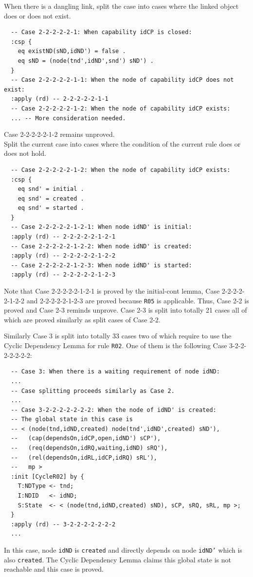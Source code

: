 \documentclass[12pt]{report}
\begin{document}
 When there is a dangling link, split the case
into cases where the linked object does or does not exist.
\small
\begin{verbatim}
  -- Case 2-2-2-2-2-1: When capability idCP is closed:
  :csp {
    eq existND(sND,idND') = false .
    eq sND = (node(tnd',idND',snd') sND') .
  }
  -- Case 2-2-2-2-2-1-1: When the node of capability idCP does not exist:
  :apply (rd) -- 2-2-2-2-2-1-1
  -- Case 2-2-2-2-2-1-2: When the node of capability idCP exists:
  ... -- More consideration needed.
\end{verbatim}
\normalsize
Case 2-2-2-2-2-1-2 remains unproved.\\

 Split the current case into cases where
the condition of the current rule does or does not hold.
\small
\begin{verbatim}
  -- Case 2-2-2-2-2-1-2: When the node of capability idCP exists:
  :csp {
    eq snd' = initial .
    eq snd' = created .
    eq snd' = started .
  }
  -- Case 2-2-2-2-2-1-2-1: When node idND' is initial:
  :apply (rd) -- 2-2-2-2-2-1-2-1
  -- Case 2-2-2-2-2-1-2-2: When node idND' is created:
  :apply (rd) -- 2-2-2-2-2-1-2-2
  -- Case 2-2-2-2-2-1-2-3: When node idND' is started:
  :apply (rd) -- 2-2-2-2-2-1-2-3
\end{verbatim}
\normalsize
Note that Case 2-2-2-2-2-1-2-1 is proved by the initial-cont lemma,
Case 2-2-2-2-2-1-2-2 and 2-2-2-2-2-1-2-3 are proved because {\tt R05}
is applicable. Thus, Case 2-2 is proved and Case 2-3 reminds unprove.
Case 2-3 is split into totally 21 cases all
of which are proved similarly as split cases of Case 2-2.

Similarly Case 3 is split into totally 33 cases two of which require
to use the Cyclic Dependency Lemma for rule {\tt R02}. One of them
is the following Case 3-2-2-2-2-2-2-2:
\small
\begin{verbatim}
  -- Case 3: When there is a waiting requirement of node idND:
  ...
  -- Case splitting proceeds similarly as Case 2.
  ...
  -- Case 3-2-2-2-2-2-2-2: When the node of idND' is created:
  -- The global state in this case is
  -- < (node(tnd,idND,created) node(tnd',idND',created) sND'),
  --   (cap(dependsOn,idCP,open,idND') sCP'),
  --   (req(dependsOn,idRQ,waiting,idND) sRQ'),
  --   (rel(dependsOn,idRL,idCP,idRQ) sRL'),
  --   mp >
  :init [CycleR02] by {
    T:NDType <- tnd;
    I:NDID   <- idND;
    S:State  <- < (node(tnd,idND,created) sND), sCP, sRQ, sRL, mp >;
  }
  :apply (rd) -- 3-2-2-2-2-2-2-2
  ...
\end{verbatim}
\normalsize
In this case, node {\tt idND} is {\tt created} and directly depends on
node {\tt idND'} which is also {\tt created}. The Cyclic Dependency
Lemma claims this global state is not reachable and this case is proved.
\end{document}
